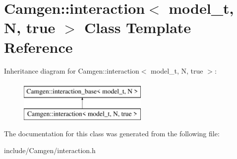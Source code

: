\hypertarget{a00311}{\section{Camgen\-:\-:interaction$<$ model\-\_\-t, N, true $>$ Class Template Reference}
\label{a00311}
}
Inheritance diagram for Camgen\-:\-:interaction$<$ model\-\_\-t, N, true $>$\-:\begin{figure}[H]
\begin{center}
\leavevmode
\includegraphics[height=2.000000cm]{a00311}
\end{center}
\end{figure}


The documentation for this class was generated from the following file\-:\begin{DoxyCompactItemize}
\item 
include/\-Camgen/interaction.\-h\end{DoxyCompactItemize}
